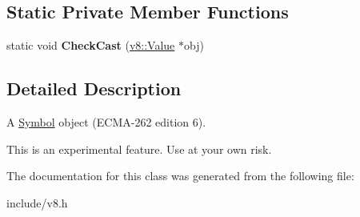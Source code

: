 \subsection*{Static Private Member Functions}
\begin{DoxyCompactItemize}
\item 
static void {\bfseries Check\+Cast} (\hyperlink{classv8_1_1_value}{v8\+::\+Value} $\ast$obj)\hypertarget{classv8_1_1_symbol_object_ae3e8e6b56b7893acc3deb924b653e349}{}\label{classv8_1_1_symbol_object_ae3e8e6b56b7893acc3deb924b653e349}

\end{DoxyCompactItemize}


\subsection{Detailed Description}
A \hyperlink{classv8_1_1_symbol}{Symbol} object (E\+C\+M\+A-\/262 edition 6).

This is an experimental feature. Use at your own risk. 

The documentation for this class was generated from the following file\+:\begin{DoxyCompactItemize}
\item 
include/v8.\+h\end{DoxyCompactItemize}
